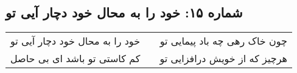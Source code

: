 \begin{center}
\section*{شماره ۱۵: خود را به محال خود دچار آیی تو}
\label{sec:015}
\begin{longtable}{l p{0.5cm} r}
خود را به محال خود دچار آیی تو
&&
چون خاک رهی چه باد پیمایی تو
\\
کم کاستی تو باشد ای بی حاصل
&&
هرچیز که از خویش درافزایی تو
\\
\end{longtable}
\end{center}
